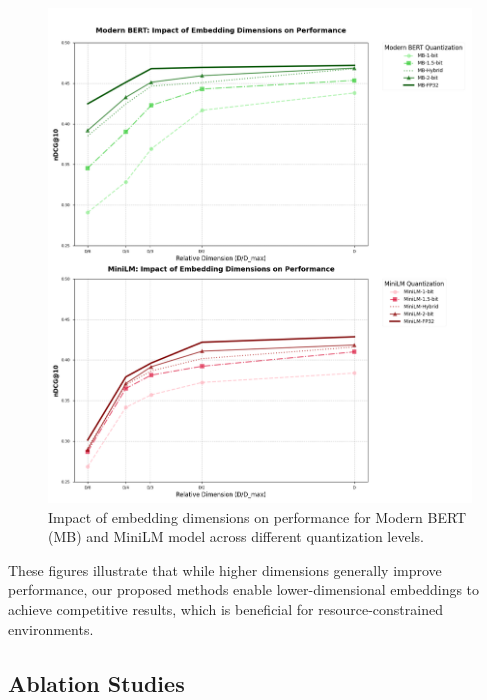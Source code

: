 \begin{figure}[ht]
    \centering
    \includegraphics[width=0.8\linewidth]{result_fig_1.png}
    \caption{Impact of embedding dimensions on performance for Modern BERT (MB) and MiniLM model across different quantization levels.}
    \label{fig:dimension_impact_mb}
\end{figure}


These figures illustrate that while higher dimensions generally improve performance, our proposed methods enable lower-dimensional embeddings to achieve competitive results, which is beneficial for resource-constrained environments.

\subsection{Ablation Studies}
\label{sec:ablation_summaries}

